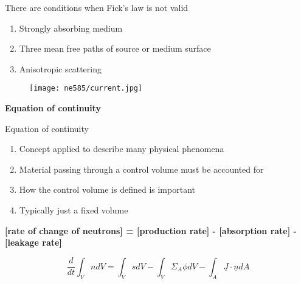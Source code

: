 \documentclass[aspectratio=1610,pdftex,dvipsnames,compress,xcolor={dvipsnames}]{beamer}
\begin{document}
\begin{frame}{There are conditions when Fick's law is not valid}
    \begin{enumerate}[series=outerlist,topsep=0pt,itemsep=21pt,leftmargin=*,label=(\arabic*)]
        \item[]Strongly absorbing medium
        \item[]Three mean free paths of source or medium surface
        \item[]Anisotropic scattering
    \end{enumerate}
\end{frame}


\begin{frame}{}
    \begin{figure}
        \centering
        \texttt{[image: ne585/current.jpg]}
    \end{figure}
\end{frame}


\begin{frame}[plain]{}
    \centering\LARGE\textbf{Equation of continuity}
\end{frame}


\addtocounter{framenumber}{-1} 
\begin{frame}{Equation of continuity}
    \begin{enumerate}[series=outerlist,topsep=0pt,itemsep=21pt,leftmargin=*,label=(\arabic*)]
        \item[]Concept applied to describe many physical phenomena
        \item[]Material passing through a control volume must be accounted for
        \item[]How the control volume is defined is important
        \item[]Typically just a fixed volume
    \end{enumerate}
\end{frame}




\begin{frame}[plain]{}
    \centering\textbf{[rate of change of neutrons] = [production rate] - [absorption rate] - [leakage rate]}
\end{frame}


\begin{frame}[plain]{}
    \LARGE
    \begin{equation*}
        \frac{d}{dt} \int_V n dV =
        \int_V s dV - \int_V \Sigma_A \phi dV - \int_A \underline{J} \cdot \underline{n} dA
    \end{equation*}
\end{frame}
\end{document}
